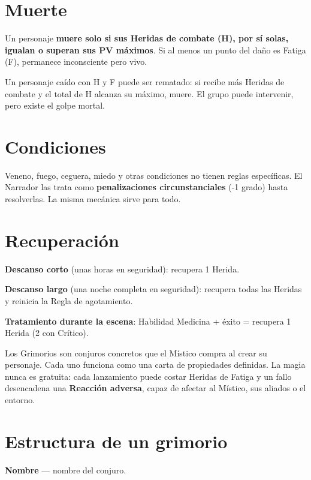 \documentclass[10pt,a4paper]{article}
\begin{document}
\section*{Muerte}
Un personaje \textbf{muere solo si sus Heridas de combate (H), por sí solas, igualan o superan sus PV máximos}. Si al menos un punto del daño es Fatiga (F), permanece inconsciente pero vivo.

Un personaje caído con H y F puede ser rematado: si recibe más Heridas de combate y el total de H alcanza su máximo, muere. El grupo puede intervenir, pero existe el golpe mortal.

\section*{Condiciones}
Veneno, fuego, ceguera, miedo y otras condiciones no tienen reglas específicas. El Narrador las trata como \textbf{penalizaciones circunstanciales} (-1 grado) hasta resolverlas. La misma mecánica sirve para todo.

\section*{Recuperación}
\textbf{Descanso corto} (unas horas en seguridad): recupera 1 Herida.

\textbf{Descanso largo} (una noche completa en seguridad): recupera todas las Heridas y reinicia la Regla de agotamiento.

\textbf{Tratamiento durante la escena}: Habilidad Medicina + éxito = recupera 1 Herida (2 con Crítico).

Los Grimorios son conjuros concretos que el Místico compra al crear su personaje. Cada uno funciona como una carta de propiedades definidas. La magia nunca es gratuita: cada lanzamiento puede costar Heridas de Fatiga y un fallo desencadena una \textbf{Reacción adversa}, capaz de afectar al Místico, sus aliados o el entorno.

\section*{Estructura de un grimorio}
\textbf{Nombre} — nombre del conjuro.
\end{document}
